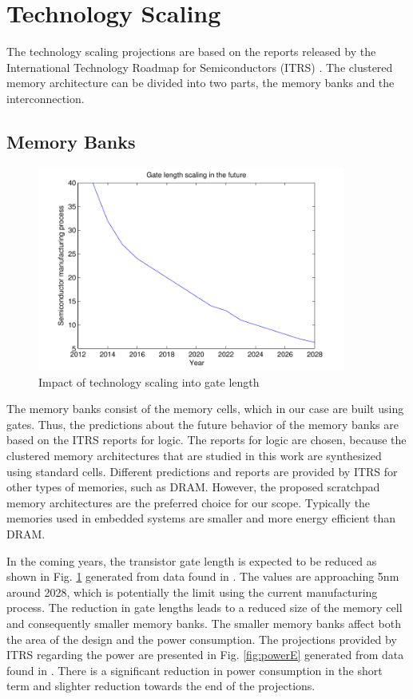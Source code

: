 \section{Technology Scaling}
\label{future}

The technology scaling projections are based on the reports released by the International Technology Roadmap for Semiconductors (ITRS)  \cite{itrs}.
The clustered memory architecture can be divided into two parts, the memory banks and the interconnection.

\subsection{Memory Banks}

\begin{figure}
 \centering
 \includegraphics[width = 0.9\textwidth]{E/gate.pdf}
  \caption{Impact of technology scaling into gate length}
 \label{fig:gateE}
 \end{figure}
 
The memory banks consist of the memory cells, which in our case are built using gates.
Thus, the predictions about the future behavior of the memory banks are based on the ITRS reports for logic.
The reports for logic are chosen, because the clustered memory architectures that are studied in this work are synthesized using standard cells.
Different predictions and reports are provided by ITRS for other types of memories, such as DRAM.
However, the proposed scratchpad memory architectures are the preferred choice for our scope.
Typically the memories used in embedded systems are smaller and more energy efficient than DRAM.

In the coming years, the transistor gate length is expected to be reduced as shown in Fig. \ref{fig:gateE} generated from data found in \cite{itrs2}.
The values are approaching 5nm around 2028, which is potentially the limit using the current manufacturing process.
The reduction in gate lengths leads to a reduced size of the memory cell and consequently smaller memory banks.
The smaller memory banks affect both the area of the design and the power consumption.
The projections provided by ITRS regarding the power are presented in Fig. \ref{fig:powerE} generated from data found in \cite{itrs2}. 
There is a significant reduction in power consumption in the short term and slighter reduction towards the end of the projections.

